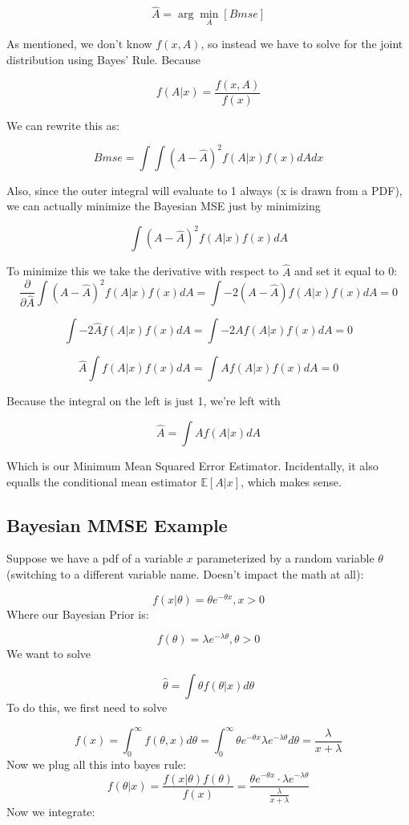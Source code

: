 \documentclass[12pt]{article}
\begin{document}
\[\hat{A} = \arg\min_A [Bmse]\]

As mentioned, we don't know \(f(x,A)\), so instead we have to solve for the joint distribution using Bayes' Rule. Because

\[f(A | x) = \frac{f(x,A)}{f(x)}\]

We can rewrite this as:

\[Bmse = \int \int \left(A - \hat{A}\right)^2 f(A | x)f(x)dAdx\]

Also, since the outer integral will evaluate to 1 always (x is drawn from a PDF), we can actually minimize the Bayesian MSE just by minimizing

\[\int \left(A - \hat{A}\right)^2 f(A | x)f(x)dA\]

To minimize this we take the derivative with respect to \(\hat{A}\) and set it equal to 0:
\[
\frac{\partial}{\partial \hat{A}} \int \left(A - \hat{A}\right)^2 f(A | x)f(x)dA = \int -2\left(A - \hat{A}\right) f(A | x)f(x)dA = 0 
\]

\[\int -2\hat{A} f(A | x)f(x)dA = \int -2A f(A | x)f(x)dA = 0\]

\[\hat{A} \int f(A | x)f(x)dA = \int A f(A | x)f(x)dA = 0\]

Because the integral on the left is just 1, we're left with 

\[\hat{A} = \int A f(A | x)dA \]

Which is our Minimum Mean Squared Error Estimator. Incidentally, it also equalls the conditional mean estimator \(\mathbb{E}[A|x]\), which makes sense. 
\subsection{Bayesian MMSE Example}
Suppose we have a pdf of a variable \(x\) parameterized by a random variable \(\theta\) (switching to a different variable name. Doesn't impact the math at all):

\[f(x|\theta) = \theta e ^{-\theta x}, x>0\]
Where our Bayesian Prior is:

\[f(\theta) = \lambda e^{-\lambda \theta}, \theta>0\]
We want to solve 

\[\hat{\theta} = \int \theta f(\theta | x)d\theta \]
To do this, we first need to solve 

\[f(x) = \int_0^{\infty} f(\theta, x) d\theta = \int_0^{\infty} \theta e^{-\theta x} \lambda e^{-\lambda \theta} d\theta = \frac{\lambda}{x+\lambda}\]
Now we plug all this into bayes rule:
\[f(\theta | x) = \frac{f(x|\theta) f(\theta)}{f(x)} = \frac{\theta e ^{-\theta x} \cdot  \lambda e^{-\lambda \theta}}{\frac{\lambda}{x+\lambda}}\]
Now we integrate:
\end{document}
